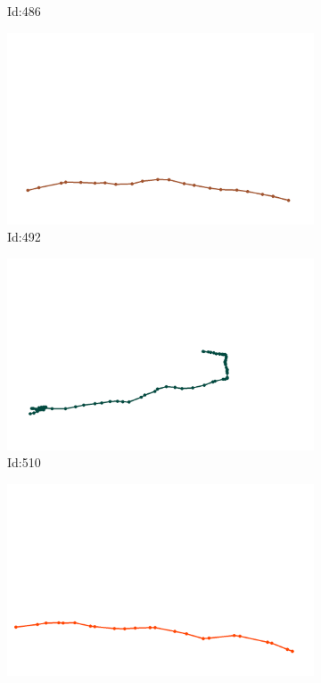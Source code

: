 \documentclass[12pt,twoside]{report}
\begin{document}
\begin{figure}
\begin{subfigure}[b]{0.20\textwidth}
\caption{Id:486}
\end{subfigure}
\begin{subfigure}[b]{0.20\textwidth}
\centering
\includegraphics[width=\textwidth]{../trajectories/492.png}
\caption{Id:492}
\end{subfigure}
\begin{subfigure}[b]{0.20\textwidth}
\centering
\includegraphics[width=\textwidth]{../trajectories/510.png}
\caption{Id:510}
\end{subfigure}
\begin{subfigure}[b]{0.20\textwidth}
\centering
\includegraphics[width=\textwidth]{../trajectories/541.png}

\end{subfigure}
\end{figure}
\end{document}
